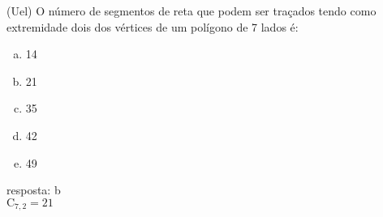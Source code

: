 \begin{ex}
 (Uel) O número de segmentos de reta que podem ser traçados tendo como extremidade dois dos vértices de um polígono de 7 lados é:
    \begin{enumerate}[(a)]
    \item 14
    \item 21
    \item 35
    \item 42
    \item 49
    \end{enumerate}
      \begin{sol}
       resposta: b\\
       $\mathrm{C}_{7,2}=21$
      \end{sol}
\end{ex}